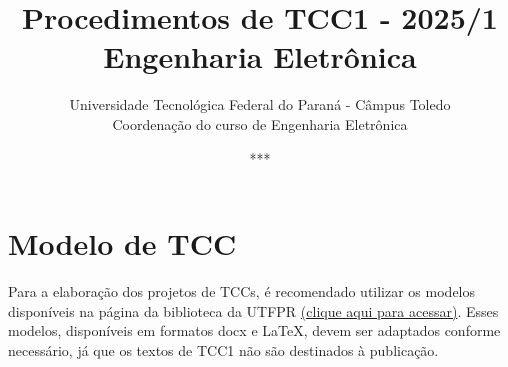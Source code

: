 \documentclass[a4paper, 12pt]{article}
\title{Procedimentos de TCC1 - 2025/1\\\textbf{Engenharia Eletrônica}}
\date{***}
\author{Universidade Tecnológica Federal do Paraná - Câmpus Toledo\\Coordenação do curso de Engenharia Eletrônica}
\begin{document}
    \maketitle
    
    \section{Modelo de TCC}

	Para a elaboração dos projetos de TCCs, é recomendado utilizar os modelos disponíveis na página da biblioteca da UTFPR \href{http://portal.utfpr.edu.br/biblioteca/trabalhos-academicos}{(clique aqui para acessar)}. Esses modelos, disponíveis em formatos docx e \LaTeX, devem ser adaptados conforme necessário, já que os textos de TCC1 não são destinados à publicação. %

    
\end{document}
